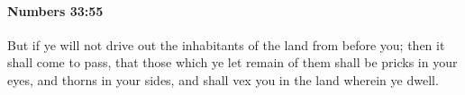 
		\paragraph{Numbers 33:55} %
			\label{NUMBERS-33-55}

			But if ye will not drive out the inhabitants of the land from before you; then it shall come to pass, that those which ye let remain of them shall be pricks in your eyes, and thorns in your sides, and shall vex you in the land wherein ye dwell.


